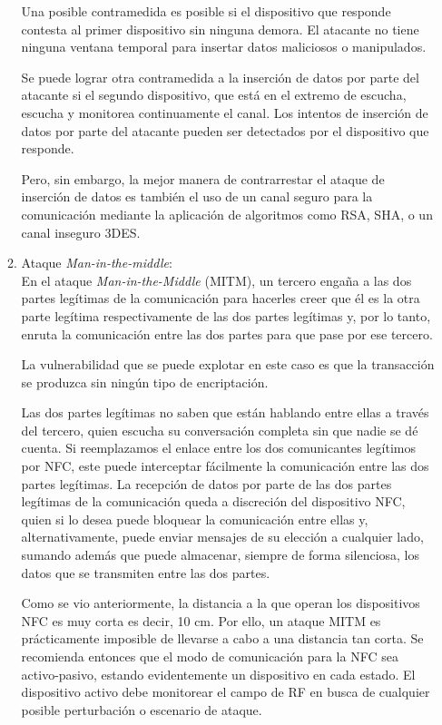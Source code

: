 \documentclass[12pt,a4paper,onecolumn,oneside]{report}
\begin{document}
\begin{enumerate}
\begin{enumerate}
Una posible contramedida es posible si el dispositivo que responde contesta al primer dispositivo sin ninguna demora. El atacante no tiene ninguna ventana temporal para insertar datos maliciosos o manipulados. 

Se puede lograr otra contramedida a la inserción de datos por parte del atacante si el segundo dispositivo, que está en el extremo de escucha, escucha y monitorea continuamente el canal. Los intentos de inserción de datos por parte del atacante pueden ser detectados por el dispositivo que responde. 

Pero, sin embargo, la mejor manera de contrarrestar el ataque de inserción de datos es también el uso de un canal seguro para la comunicación mediante la aplicación de algoritmos como RSA, SHA, o un canal inseguro 3DES.

\item Ataque \textit{Man-in-the-middle}:\\
En el ataque \textit{Man-in-the-Middle} (MITM), un tercero engaña a las dos partes legítimas de la comunicación para hacerles creer que él es la otra parte legítima respectivamente de las dos partes legítimas y, por lo tanto, enruta la comunicación entre las dos partes para que pase por ese tercero. 

La vulnerabilidad que se puede explotar en este caso es que la transacción se produzca sin ningún tipo de encriptación.

Las dos partes legítimas no saben que están hablando entre ellas a través del tercero, quien escucha su conversación completa sin que nadie se dé cuenta. Si reemplazamos el enlace entre los dos comunicantes legítimos por NFC, este puede interceptar fácilmente la comunicación entre las dos partes legítimas. La recepción de datos por parte de las dos partes legítimas de la comunicación queda a discreción del dispositivo NFC, quien si lo desea puede bloquear la comunicación entre ellas y, alternativamente, puede enviar mensajes de su elección a cualquier lado, sumando además que puede almacenar, siempre de forma silenciosa,  los datos que se transmiten entre las dos partes.

Como se vio anteriormente, la distancia a la que operan los dispositivos NFC es muy corta es decir, 10 cm. Por ello, un ataque MITM es prácticamente imposible de llevarse a cabo a una distancia tan corta. Se recomienda entonces que el modo de comunicación para la NFC sea activo-pasivo, estando evidentemente un dispositivo en cada estado. El dispositivo activo debe monitorear el campo de RF en busca de cualquier posible perturbación o escenario de ataque.


\end{enumerate}
\end{enumerate}
\end{document}
